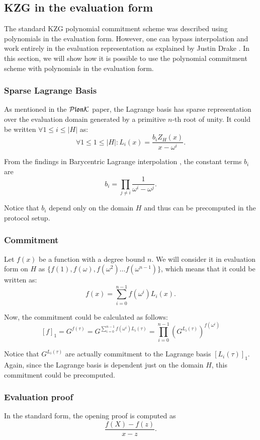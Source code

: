 \subsection{KZG in the evaluation form}
\label{sec:kzg-evaluation-form}
The standard KZG polynomial commitment scheme was described using polynomials in the evaluation form. However, one can bypass interpolation and work entirely in the evaluation representation as explained by Justin Drake \cite{plonk-without-fft}. In this section, we will show how it is possible to use the polynomial commitment scheme with polynomials in the evaluation form.

\subsubsection{Sparse Lagrange Basis}
As mentioned in the $\mathcal{P}\mathfrak{lon}\mathcal{K}$ paper, the Lagrange basis has sparse representation over the evaluation domain generated by a primitive $n$-th root of unity. It could be written $\forall 1 \leq i \leq |H|$ as:
$$\forall 1 \leq 1 \leq |H|: L_i(x) = \frac{b_i Z_H(x)}{x - \omega^i}.$$

From the findings in Barycentric Lagrange interpolation \cite{BarycentricLagrange}, the constant terms $b_i$ are
$$b_i = \prod_{j \neq i} \frac{1}{\omega^i - \omega^j}.$$

Notice that $b_i$ depend only on the domain $H$ and thus can be precomputed in the protocol setup.

\subsubsection{Commitment}
Let $f(x)$ be a function with a degree bound $n$. We will consider it in evaluation form on $H$ as $\{f(1), f(\omega), f(\omega^2) \ldots f(\omega^{n-1})\}$, which means that it could be written as: $$f(x) = \sum_{i=0}^{n-1} f(\omega^i)L_i(x).$$

Now, the commitment could be calculated as follows:
$$[f]_1 = G^{f(\tau)} = G^{\sum_{i=0}^{n-1} f(\omega^i) L_i(\tau)} = \prod_{i=0}^{n-1} (G^{L_i(\tau)})^{f(\omega^i)}$$

Notice that $G^{L_i(\tau)}$ are actually commitment to the Lagrange basis $[L_i(\tau)]_1$. Again, since the Lagrange basis is dependent just on the domain $H$, this commitment could be precomputed. 

\subsubsection{Evaluation proof}
In the standard form, the opening proof is computed as $$\frac{f(X)-f(z)}{x-z}.$$

